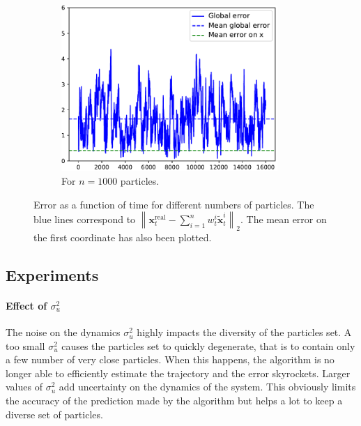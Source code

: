 \documentclass[english, DIV=13]{scrartcl}
\newcommand\norm[1]{\left\lVert#1\right\rVert}
\begin{document}
\begin{figure}
\begin{subfigure}{0.49\textwidth}
        \includegraphics[width=0.9\textwidth]{figures/error-1000}
        \caption{For $n=1000$ particles.} 
        \label{fig:q3-error-1000}
    \end{subfigure}
    \caption{Error as a function of time for different numbers of particles. The blue
    lines correspond to
    $\norm{\mathbf{x}_t^{\text{real}} - \sum_{i=1}^n w_t^i\tilde{\mathbf{x}}_t^i}_2$.
    The mean error on the first coordinate has also been plotted.}
\end{figure}

\subsection{Experiments}
\label{sec:exp}
\paragraph{Effect of $\sigma^2_u$}
The noise on the dynamics $\sigma^2_u$ highly impacts the diversity of the particles set.
A too small $\sigma^2_u$ causes the particles set to quickly degenerate, that is to
contain only a few number of very close particles. When this happens, the algorithm is
no longer able to efficiently estimate the trajectory and the error skyrockets. Larger
values of $\sigma^2_u$ add uncertainty on the dynamics of the system. This obviously
limits the accuracy of the prediction made by the algorithm but helps a lot to keep
a diverse set of particles.
\end{document}
